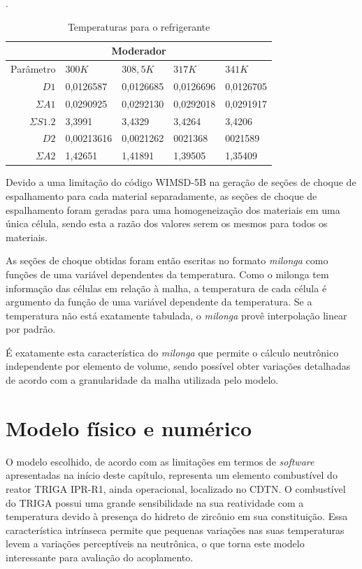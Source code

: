 \begin{table}[htb]
  \centering
  \caption[Temperaturas para o refrigerante.]{Temperaturas para o refrigerante}.
  \label{tab:temp-coolant}
  \begin{tabular}{r l l l l}
    \multicolumn{5}{c}{Moderador} \\
    \hline
    Parâmetro & $300K$ & $308,5K$ & $317K$ & $341K$ \\
    \hline
    $D1$ & 0,0126587 & 0,0126685 & 0,0126696 & 0,0126705\\
    $\Sigma A1$ & 0,0290925 & 0,0292130 & 0,0292018 & 0,0291917\\
    $\Sigma S1.2$ & 3,3991 & 3,4329 & 3,4264 & 3,4206\\
    \hline
    $D2$ & 0,00213616 & 0,0021262 & 0021368 & 0021589\\
    $\Sigma A2$ & 1,42651 & 1,41891 & 1,39505 & 1,35409\\
    \hline
  \end{tabular}
\end{table}


Devido a uma limitação do código WIMSD-5B na geração de seções de choque de espalhamento
para cada material separadamente, as seções de choque de
espalhamento foram geradas para uma homogeneização dos materiais em uma única célula,
sendo esta a razão dos valores serem os mesmos para todos os materiais.

%
%
As seções de choque obtidas foram então escritas no formato \textit{milonga} como
funções de uma variável dependentes da temperatura. Como o milonga tem informação
das células em relação à malha, a temperatura de cada célula é argumento da
função de uma variável dependente da temperatura. Se a temperatura não está
exatamente tabulada, o \textit{milonga} provê interpolação linear por padrão.

É exatamente esta característica do \textit{milonga} que permite o cálculo neutrônico
independente por elemento de volume, sendo possível obter variações detalhadas
de acordo com a granularidade da malha utilizada pelo modelo.

\section{Modelo físico e numérico}
\label{sec:mod_fis_num}

O modelo escolhido, de acordo com as limitações em termos
de \textit{software} apresentadas na início deste capítulo, representa um
elemento combustível do reator TRIGA IPR-R1, ainda operacional, localizado
no CDTN. O combustível do TRIGA possui uma grande sensibilidade na sua
reatividade com a temperatura devido à presença do hidreto de zircônio
em sua constituição. Essa característica intrínseca permite que pequenas
variações nas suas temperaturas levem a variações perceptíveis na neutrônica,
o que torna este modelo interessante para avaliação do acoplamento.


